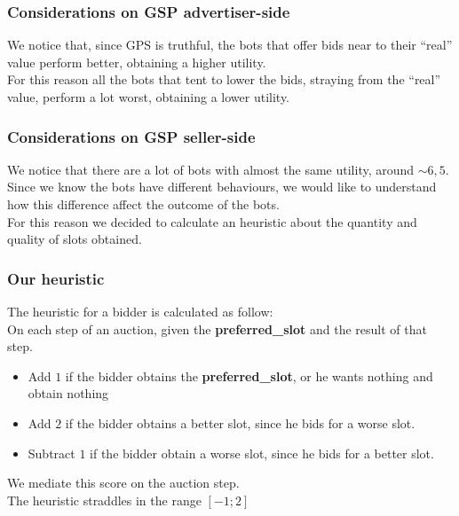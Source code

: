 \documentclass{beamer}
\begin{document}
\begin{frame}
\frametitle{Considerations on GSP advertiser-side}
We notice that, since GPS is truthful, the bots that offer bids near to their ``real'' value perform \alert{better}, obtaining a higher utility.\\
\medskip
For this reason all the bots that tent to lower the bids, straying from the ``real'' value, perform a lot \alert{worst}, obtaining a lower utility. 
\end{frame}


\begin{frame}
\frametitle{Considerations on GSP seller-side}
We notice that there are a lot of bots with  almost the same utility, around $\sim6,5$.\\
\medskip
Since we know the bots have different  behaviours, we would like to understand how this difference affect the outcome of the bots.\\
\bigskip
For this reason we decided to calculate an heuristic about the quantity and quality of slots obtained.
\end{frame}

\begin{frame}
\frametitle{Our heuristic}
The heuristic for a bidder is calculated as follow:\\
\medskip
On each step of an auction, given the \textbf{preferred\_slot} and the result of that step.
\begin{itemize}
\item Add $1$ if the bidder obtains the \textbf{preferred\_slot}, or he wants nothing and obtain nothing 
\item Add $2$ if the bidder obtains a better slot, since he bids for a worse slot.
\item Subtract $1$ if the bidder obtain a worse slot, since he bids for a better slot.
\end{itemize}
We mediate this score on the auction step.\\
The heuristic straddles in the range $ [-1;2]$
\end{frame}
\end{document}
